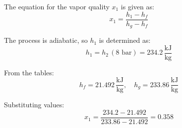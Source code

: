 The equation for the vapor quality \( x_1 \) is given as:  
\[
x_1 = \frac{h_1 - h_f}{h_g - h_f}
\]  

The process is adiabatic, so \( h_1 \) is determined as:  
\[
h_1 = h_2 \, (\text{8 bar}) = 234.2 \, \frac{\text{kJ}}{\text{kg}}
\]  

From the tables:  
\[
h_f = 21.492 \, \frac{\text{kJ}}{\text{kg}}, \quad h_g = 233.86 \, \frac{\text{kJ}}{\text{kg}}
\]  

Substituting values:  
\[
x_1 = \frac{234.2 - 21.492}{233.86 - 21.492} = 0.358
\]
